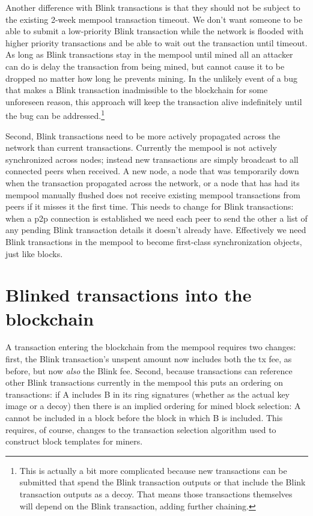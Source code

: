 Another difference with Blink transactions is that they should not be
subject to the existing 2-week mempool transaction timeout. We don't
want someone to be able to submit a low-priority Blink transaction while
the network is flooded with higher priority transactions and be able to
wait out the transaction until timeout. As long as Blink transactions
stay in the mempool until mined all an attacker can do is delay the
transaction from being mined, but cannot cause it to be dropped no
matter how long he prevents mining. In the unlikely event of a bug that
makes a Blink transaction inadmissible to the blockchain for some
unforeseen reason, this approach will keep the transaction alive
indefinitely until the bug can be addressed.\footnote{This is actually a
  bit more complicated because new transactions can be submitted that
  spend the Blink transaction outputs or that include the Blink
  transaction outputs as a decoy. That means those transactions
  themselves will depend on the Blink transaction, adding further
  chaining.}

Second, Blink transactions need to be more actively propagated across
the network than current transactions. Currently the mempool is not
actively synchronized across nodes; instead new transactions are simply
broadcast to all connected peers when received. A new node, a node that
was temporarily down when the transaction propagated across the network,
or a node that has had its mempool manually flushed does not receive
existing mempool transactions from peers if it misses it the first time.
This needs to change for Blink transactions: when a p2p connection is
established we need each peer to send the other a list of any pending
Blink transaction details it doesn't already have. Effectively we need
Blink transactions in the mempool to become first-class synchronization
objects, just like blocks.

\hypertarget{blinked-transactions-into-the-blockchain}{%
\section{Blinked transactions into the
blockchain}\label{blinked-transactions-into-the-blockchain}}

A transaction entering the blockchain from the mempool requires two
changes: first, the Blink transaction's unspent amount now includes both
the tx fee, as before, but now \emph{also} the Blink fee. Second,
because transactions can reference other Blink transactions currently in
the mempool this puts an ordering on transactions: if A includes B in
its ring signatures (whether as the actual key image or a decoy) then
there is an implied ordering for mined block selection: A cannot be
included in a block before the block in which B is included. This
requires, of course, changes to the transaction selection algorithm used
to construct block templates for miners.

